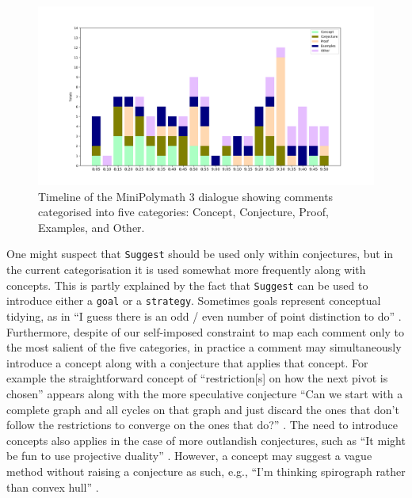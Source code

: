\documentclass[smallextended,oneside]{svjour3}       %
\let\cite\citep
\newcommand\nothing[1]{#1}
\let\paragraph\nothing
\begin{document}
\begin{figure}[h]
\begin{center}
\includegraphics[trim=3cm 1.2cm 3cm 1.2cm,clip=true,width=\textwidth]{alternative}
\end{center}
\caption{Timeline of the MiniPolymath 3 dialogue showing comments categorised into five categories: Concept, Conjecture, Proof, Examples, and Other.
\label{fig:alternative}}
\end{figure}

\paragraph{One might suspect that \texttt{Suggest} should be used only within conjectures, but in the current categorisation it is used somewhat more frequently along with concepts.}
This is partly explained by the fact that \texttt{Suggest} can be used
to introduce either a \texttt{goal} or a \texttt{strategy}.  Sometimes goals
represent conceptual tidying, as in ``I guess there is an odd / even
number of point distinction to do'' \cite[\href{https://wp.me/pAG2F-41\#comment-3398}{July 19, 9:31 pm}]{tao2011imo}.
\paragraph{Furthermore, despite of our self-imposed constraint to map each comment only to the most salient of the five categories, in practice a comment may simultaneously introduce a concept along with a conjecture that applies that concept.}
For example the straightforward concept of
``restriction[s] on how the next pivot is chosen''
appears along with the more speculative conjecture  ``Can we
start with a complete graph and all cycles on that graph and just
discard the ones that don't follow the restrictions to converge on the
ones that do?''
\cite[\href{https://wp.me/pAG2F-41\#comment-3368}{July 19, 8:56 pm}]{tao2011imo}.
The need to introduce concepts also applies in the case of more outlandish conjectures,
such as
``It might be fun to use projective duality''
\cite[\href{https://wp.me/pAG2F-41\#comment-3324}{July 19, 8:23 pm}]{tao2011imo}.
However, a concept may suggest a vague method
without raising a conjecture as such,
e.g., ``I'm thinking spirograph rather than convex hull''
\cite[\href{https://wp.me/pAG2F-41\#comment-3349}{July 19, 8:44 pm}]{tao2011imo}.
\end{document}
